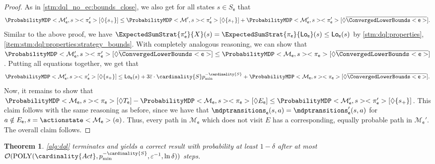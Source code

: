 \documentclass{article}
\newtheorem{theorem}{Theorem}\newtheorem{lemma}[theorem]{Lemma}\newtheorem{proposition}[theorem]{Proposition}\newtheorem{corollary}[theorem]{Corollary}\newtheorem{definition}[theorem]{Definition}\newtheorem{claim}[theorem]{Claim}\newtheorem{remark}[theorem]{Remark}\newtheorem{observation}[theorem]{Observation}\newtheorem{conjecture}[theorem]{Conjecture}\newtheorem{example}[theorem]{Example}
\newcommand{\MDP}{\mathcal{M}}
\newcommand{\States}{S}
\newcommand{\Actions}{Act}
\newcommand{\strategy}{\pi}
\newcommand{\reach}{\Diamond}
\newcommand{\lowerbound}{\mathsf{Lo}}
\newcommand{\targetstate}{s_+}
\newcommand{\targetset}{T}
\newcommand{\updatestep}{{\overline{\varepsilon}}}
\newcommand{\algoepisode}{\mathsf{e}}
\begin{document}
\begin{proof}
	As in \cref{stm:dql_no_ec:bounds_close}, we also get for all states $s \in \States_\algoepisode$ that
	\begin{equation*}
		\ProbabilityMDP<\MDP'_\algoepisode, s><\strategy'_\algoepisode>[\reach \{\targetstate\}] \leq \ProbabilityMDP<\MDP', s><\strategy'_\algoepisode>[\reach \{\targetstate\}] + \ProbabilityMDP<\MDP'_\algoepisode, s><\strategy'_\algoepisode>[\reach \overline{\ConvergedLowerBounds<\algoepisode>}].
	\end{equation*}
	Similar to the above proof, we have $\ExpectedSumStrat{\strategy'_\algoepisode}{X}(s) = \ExpectedSumStrat{\strategy_\algoepisode}{\lowerbound_\algoepisode}(s) \leq \lowerbound_\algoepisode(s)$ by \cref{stm:dql:properties}, \cref{item:stm:dql:properties:strategy_bounds}.
	With completely analogous reasoning, we can show that $\ProbabilityMDP<\MDP'_\algoepisode, s><\strategy'_\algoepisode>[\reach \overline{\ConvergedLowerBounds<\algoepisode>}] \leq \ProbabilityMDP<\MDP_\algoepisode, s><\strategy_\algoepisode>[\reach \overline{\ConvergedLowerBounds<\algoepisode>}]$.
	Putting all equations together, we get that
	\begin{equation*}
		\ProbabilityMDP<\MDP'_\algoepisode, s><\strategy'_\algoepisode>[\reach \{\targetstate\}] \leq \lowerbound_\algoepisode(s) + 3 \updatestep \cdot \cardinality{\States} p_{\min}^{-\cardinality{\States}} + \ProbabilityMDP<\MDP_\algoepisode, s><\strategy_\algoepisode>[\reach \overline{\ConvergedLowerBounds<\algoepisode>}].
	\end{equation*}
	Now, it remains to show that $\ProbabilityMDP<\MDP_\algoepisode, s><\strategy_\algoepisode>[\reach \targetset_\algoepisode] - \ProbabilityMDP<\MDP_\algoepisode, s><\strategy_\algoepisode>[\reach E_\algoepisode] \leq \ProbabilityMDP<\MDP'_\algoepisode, s><\strategy'_\algoepisode>[\reach \{\targetstate\}]$.
	This claim follows with the same reasoning as before, since we have that $\mdptransitions_\algoepisode(s, a) = \mdptransitions'_\algoepisode(s, a)$ for $a \notin E_\algoepisode, s = \actionstate<\MDP_\algoepisode>(a)$.
	Thus, every path in $\MDP_\algoepisode$ which does not visit $E$ has a corresponding, equally probable path in $\MDP_\algoepisode'$.
	The overall claim follows. 
\end{proof}


\begin{theorem} \label{stm:dql_correct}
	\cref{alg:dql} terminates and yields a correct result with probability at least $1 - \delta$ after at most $\mathcal{O}(\mathrm{POLY}(\cardinality{\Actions}, p_{\min}^{-\cardinality{\States}}, \varepsilon^{-1}, \ln \delta))$ steps.
\end{theorem}
\end{document}
